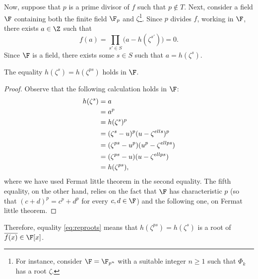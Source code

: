 Now, suppose that $p$ is a prime divisor of $f$ such that $p\notin T$. Next, consider a field $\F$ containing both the finite field $\F_p$ and $\zeta$\footnote{For instance, consider $\F=\F_{p^n}$ with a suitable integer $n\geqslant 1$ such that $\Phi_{{k}}$ has a root $\zeta$.}. Since $p$ divides $f$, working in $\F$, there exists $a\in\Z$ such that 
\begin{equation*}
f(a)=\prod_{s'\in S}\big(a-h(\zeta^{s'})\big)=0.
\end{equation*}
Since $\F$ is a field, there exists some $s\in S$ such that $a=h(\zeta^{s})$.
\begin{lemma}
The equality $h(\zeta^s)=h(\zeta^{ps})$ holds in $\F$.
\end{lemma}
\begin{proof}
 Observe that the following calculation holds in $\F$:
\begin{align}\label{eq:reproots}
h(\zeta^{s})&=a\notag \\ 
&=a^p\notag \\ 
&=h(\zeta^{s})^p\notag \\ 
&=(\zeta^{s}-{u})^p({u}-\zeta^{{ell}s})^p\notag \\ 
&=(\zeta^{ps}-{u}^p)({u}^p-\zeta^{{ell}ps})\notag \\ 
&=(\zeta^{ps}-{u})({u}-\zeta^{{ell}ps})\notag \\ 
&=h(\zeta^{ps}),
\end{align}
where we have used Fermat little theorem in the second equality. The fifth equality, on the other hand, relies on the fact that $\F$ has characteristic $p$ (so that $(c+d)^p=c^p+d^p$ for every $c,d \in \F$) and the following one, on Fermat little theorem.
\end{proof}

Therefore, equality \eqref{eq:reproots} means that $h(\zeta^{ps})=h(\zeta^{s})$ is a root of $\overline{f(x)}\in\F[x]$. 

